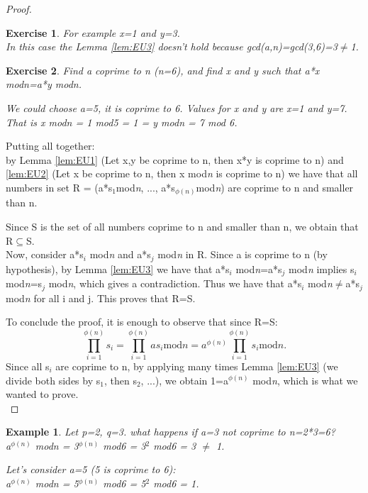 \documentclass[a4paper, 12pt]{report}
\newtheorem{example}{\textbf{Example}}
\newtheorem{exercise}{\textbf{Exercise}}
\begin{document}
\begin{proof}
\begin{exercise}
		For example x=1 and y=3.\\
		In this case the Lemma \ref{lem:EU3} doesn't hold because gcd(a,n)=gcd(3,6)=3$\ne$1. 
	\end{exercise}
	\begin{exercise}
		Find a coprime to n (n=6), and find x and y such that a*x mod\textit{n}=a*y mod\textit{n}.
		
		We could choose a=5, it is coprime to 6. Values for x and y are x=1 and y=7.\\
		That is x mod\textit{n} = 1 mod5 = 1 = y mod\textit{n} = 7 mod 6.
	\end{exercise}

	Putting all together:\\
	by Lemma \ref{lem:EU1} (Let x,y be coprime to n, then x*y is coprime to n) and \ref{lem:EU2} (Let x be coprime to n, then x mod\textit{n} is coprime to n) we have that all numbers in set R = (a*s$_1$mod\textit{n}, ..., a*s$_{\phi(n)}$mod\textit{n}) are coprime to n and smaller than n.
	
	Since S is the set of all numbers coprime to n and smaller than n, we obtain that R$\subseteq$S.\\
	Now, consider a*s$_i$ mod\textit{n} and a*s$_j$ mod\textit{n} in R. Since a is coprime to n (by hypothesis), by Lemma \ref{lem:EU3} we have that a*s$_i$ mod\textit{n}=a*s$_j$ mod\textit{n} implies s$_i$ mod\textit{n}=s$_j$ mod\textit{n}, which gives a contradiction. Thus we have that a*s$_i$ mod\textit{n}$\ne$a*s$_j$ mod\textit{n} for all i and j. This proves that R=S.
	
	To conclude the proof, it is enough to observe that since R=S:
	\[\prod_{i=1}^{\phi(n)}s_i = \prod_{i=1}^{\phi(n)}as_i \text{mod}n = a^{\phi(n)}\prod_{i=1}^{\phi(n)}s_i \text{mod}n.\]
	Since all s$_i$ are coprime to n, by applying many times Lemma \ref{lem:EU3} (we divide both sides by s$_1$, then s$_2$, ...), we obtain 1=a$^{\phi(n)}$ mod\textit{n}, which is what we wanted to prove.\\
\end{proof}

\begin{example}
	Let p=2, q=3. what happens if a=3 not coprime to n=2*3=6?\\
	a$^{\phi(n)}$ mod\textit{n} = 3$^{\phi(n)}$ mod6 = 3$^2$ mod6 = 3 $\ne$ 1.
	
	Let's consider a=5 (5 is coprime to 6):\\
	a$^{\phi(n)}$ mod\textit{n} = 5$^{\phi(n)}$ mod6 = 5$^2$ mod6 = 1.
\end{example}
\end{document}
